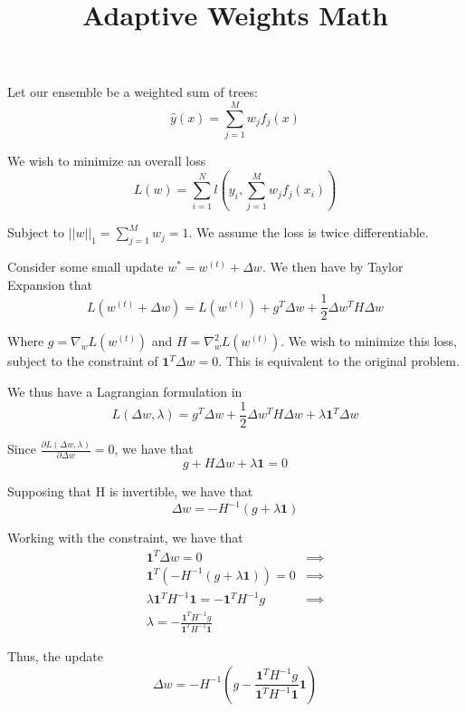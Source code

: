 \documentclass{article}
\begin{document}
\title{Adaptive Weights Math}
\author{}
\date{}

\maketitle

Let our ensemble be a weighted sum of trees: \[
\hat{y}(x) = \sum_{j=1}^M w_j f_j(x) 
\]

We wish to minimize an overall loss \[
L(w) = \sum_{i=1}^N l\left(y_i, \sum_{j=1}^M w_j f_j(x_i)\right)
\]

Subject to $||w||_1 = \sum_{j=1}^M w_j = 1$. We assume the loss is twice differentiable. 

Consider some small update $w^* = w^{(t)} + \Delta w$. We then have by Taylor Expansion that \[
L(w^{(t)} + \Delta w) = L(w^{(t)}) + g^T \Delta w  + \frac{1}{2} \Delta w^T H \Delta w
\]

Where $g = \nabla_w L(w^{(t)})$ and $H = \nabla_w^2 L(w^{(t)})$. 
We wish to minimize this loss, subject to the constraint of $\mathbf{1}^T \Delta w = 0$. This is equivalent to the original problem.

We thus have a Lagrangian formulation in \[
L(\Delta w, \lambda) = g^T\Delta w + \frac{1}{2} \Delta w^T H \Delta w + \lambda \mathbf{1}^T \Delta w
\]

Since $\frac{\partial L(\Delta w, \lambda)}{\partial \Delta w} = 0$, we have that \[
g + H \Delta w + \lambda \mathbf{1} = 0
\]

Supposing that H is invertible, we have that \[
\Delta w = -H^{-1} (g + \lambda \mathbf{1})
\]

Working with the constraint, we have that \begin{align*}
    \mathbf{1}^T \Delta w = 0 &\implies \\
    \mathbf{1}^T (-H^{-1} (g + \lambda \mathbf{1})) = 0 &\implies \\
    \lambda \mathbf{1}^T H^{-1} \mathbf{1}  = -\mathbf{1}^T H^{-1} g &\implies \\
    \lambda = -\frac{\mathbf{1}^T H^{-1} g}{\mathbf{1}^T H^{-1} \mathbf{1}}
\end{align*}

Thus, the update \[
\Delta w = -H^{-1} \left(g - \frac{\mathbf{1}^T H^{-1} g}{\mathbf{1}^T H^{-1} \mathbf{1}} \mathbf{1}\right)
\]
\end{document}
